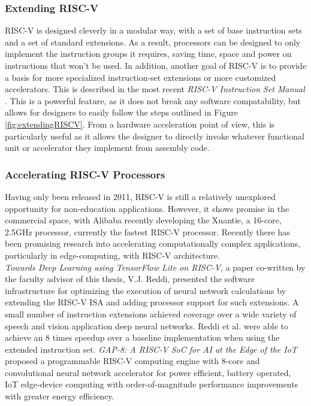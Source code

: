     \subsubsection{Extending RISC-V}
    RISC-V is designed cleverly in a modular way, with a set of base instruction sets and a set of standard extensions. As a result, processors can be designed to only implement the instruction groups it requires, saving time, space and power on instructions that won't be used. In addition, another goal of RISC-V is to provide a basis for more specialized instruction-set extensions or more customized accelerators. This is described in the most recent \textit{RISC-V Instruction Set Manual} \cite{Waterman2019}. This is a powerful feature, as it does not break any software compatability, but allows for designers to easily follow the steps outlined in Figure \ref{fig:extendingRISCV}. From a \gls{hardware acceleration} point of view, this is particularly useful as it allows the designer to directly invoke whatever functional unit or accelerator they implement from assembly code.
    

    \subsubsection{Accelerating RISC-V Processors}
    Having only been released in 2011, RISC-V is still a relatively unexplored opportunity for non-education applications. However, it shows promise in the commercial space, with Alibaba recently developing the Xuantie, a 16-core, 2.5GHz processor, currently the fastest RISC-V processor. Recently there has been promising research into accelerating computationally complex applications, particularly in edge-computing, with RISC-V architecture. \\
    \textit{Towards Deep Learning using TensorFlow Lite on RISC-V}, a paper co-written by the faculty advisor of this thesis, V.J. Reddi, presented the software infrastructure for optimizing the execution of neural network calculations by extending the RISC-V ISA and adding processor support for such extensions. A small number of instruction extensions achieved coverage over a wide variety of speech and vision application deep neural networks. Reddi et al. were able to achieve an 8 times speedup over a baseline implementation when using the extended instruction set.
    \textit{GAP-8: A RISC-V SoC for AI at the Edge of the IoT} proposed a programmable RISC-V computing engine with 8-core and convolutional neural network accelerator for power efficient, battery operated, IoT edge-device computing with order-of-magnitude performance improvements with greater energy efficiency. \\

